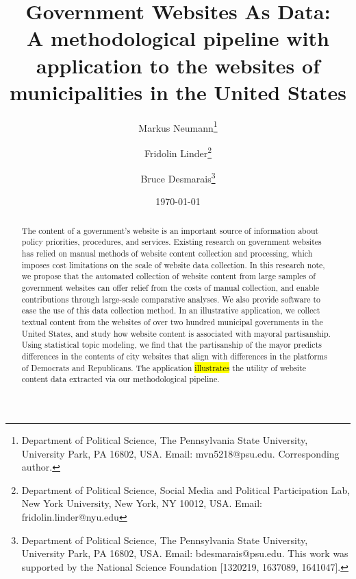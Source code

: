 \documentclass[11pt]{article}
\title{\vspace{-2cm} Government Websites As Data: \\ A methodological pipeline with application to the websites of municipalities in the United States}
\author{ Markus Neumann\footnote{Department of Political Science, The Pennsylvania State University, University Park, PA 16802, USA. Email: mvn5218@psu.edu. Corresponding author.} \and Fridolin Linder\footnote{Department of Political Science, Social Media and Political Participation Lab, New York University, New York, NY 10012, USA. Email: fridolin.linder@nyu.edu} \and Bruce Desmarais\footnote{Department of Political Science, The Pennsylvania State University, University Park, PA 16802, USA. Email: bdesmarais@psu.edu. This work was supported by the National Science Foundation [1320219, 1637089, 1641047].}} \date{\today}
\begin{document}
\maketitle 




\begin{abstract}

The content of a government's website is an important source of information about policy priorities,  procedures, and services. Existing research on government websites has relied on manual methods of website content collection and processing, which imposes cost limitations on the scale of website data collection. In this research note, we propose that the automated collection of website content from large samples of government websites can offer relief from the costs of manual collection, and enable contributions through large-scale comparative analyses.  We also provide software to ease the use of this data collection method. In an illustrative application, we collect textual content from the websites of over two hundred municipal governments in the United States, and study how website content is associated with mayoral partisanship. Using statistical topic modeling, we find that the partisanship of the mayor predicts differences in the contents of city websites that align with differences in the platforms of Democrats and Republicans. The application \hl{illustrates} the utility of website content data extracted via our methodological pipeline.


\end{abstract}
\thispagestyle{empty}
\doublespacing
\end{document}
